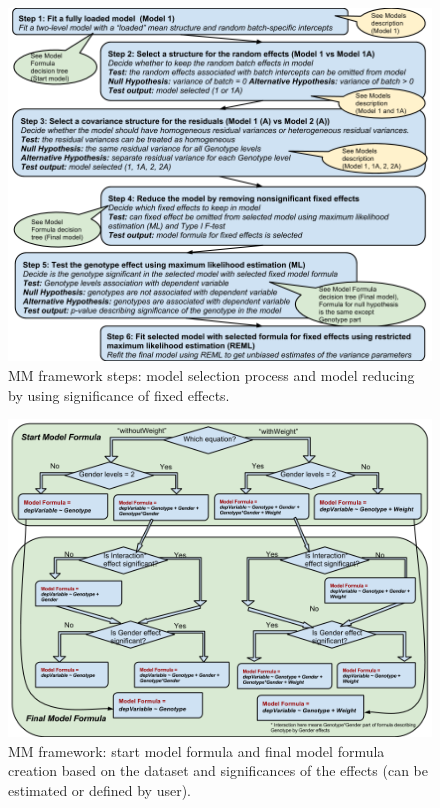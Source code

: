 \documentclass[12pt,a4paper]{article}
\begin{document}
\begin{figure}[!tpb]%
\centerline{\includegraphics[scale=0.5]{MM_framework.png}}
\caption{MM framework steps: model selection process and model reducing by using significance of fixed effects.}\label{fig:02}
\end{figure}

\begin{figure}[!tpb]%
\centerline{\includegraphics[scale=0.5]{Model_Formula.png}}
\caption{MM framework: start model formula and final model formula creation based on the dataset and significances of the effects (can be estimated or defined by user). }\label{fig:03}
\end{figure}
\end{document}
